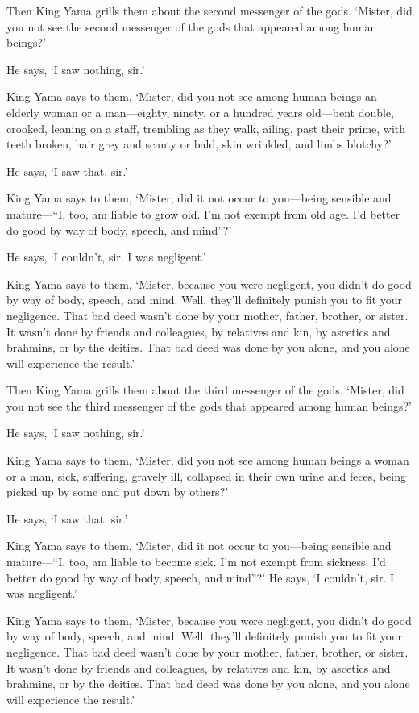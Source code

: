 \documentclass[12pt,openany]{book}%
\begin{document}
Then King Yama grills them about the second messenger of the gods. ‘Mister, did you not see the second messenger of the gods that appeared among human beings?’ 

He says, ‘I saw nothing, sir.’ 

King Yama says to them, ‘Mister, did you not see among human beings an elderly woman or a man—eighty, ninety, or a hundred years old—bent double, crooked, leaning on a staff, trembling as they walk, ailing, past their prime, with teeth broken, hair grey and scanty or bald, skin wrinkled, and limbs blotchy?’ 

He says, ‘I saw that, sir.’ 

King Yama says to them, ‘Mister, did it not occur to you—being sensible and mature—“I, too, am liable to grow old. I’m not exempt from old age. I’d better do good by way of body, speech, and mind”?’ 

He says, ‘I couldn’t, sir. I was negligent.’ 

King Yama says to them, ‘Mister, because you were negligent, you didn’t do good by way of body, speech, and mind. Well, they’ll definitely punish you to fit your negligence. That bad deed wasn’t done by your mother, father, brother, or sister. It wasn’t done by friends and colleagues, by relatives and kin, by ascetics and brahmins, or by the deities. That bad deed was done by you alone, and you alone will experience the result.’ 

Then King Yama grills them about the third messenger of the gods. ‘Mister, did you not see the third messenger of the gods that appeared among human beings?’ 

He says, ‘I saw nothing, sir.’ 

King Yama says to them, ‘Mister, did you not see among human beings a woman or a man, sick, suffering, gravely ill, collapsed in their own urine and feces, being picked up by some and put down by others?’ 

He says, ‘I saw that, sir.’ 

King Yama says to them, ‘Mister, did it not occur to you—being sensible and mature—“I, too, am liable to become sick. I’m not exempt from sickness. I’d better do good by way of body, speech, and mind”?’ He says, ‘I couldn’t, sir. I was negligent.’ 

King Yama says to them, ‘Mister, because you were negligent, you didn’t do good by way of body, speech, and mind. Well, they’ll definitely punish you to fit your negligence. That bad deed wasn’t done by your mother, father, brother, or sister. It wasn’t done by friends and colleagues, by relatives and kin, by ascetics and brahmins, or by the deities. That bad deed was done by you alone, and you alone will experience the result.’ 
\end{document}
